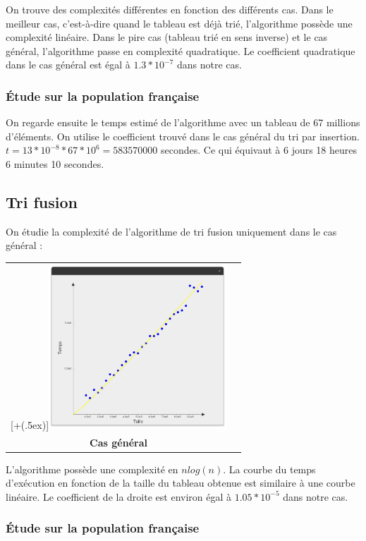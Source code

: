 \documentclass[12pt]{article}
\newcommand*{\addheight}[2][.5ex]{%
  \raisebox{0pt}[\dimexpr\height+(#1)\relax]{#2}%
}
\begin{document}
On trouve des complexités différentes en fonction des différents cas. Dans le meilleur cas, c'est-à-dire quand le tableau est déjà trié, l'algorithme possède une complexité linéaire. Dans le pire cas (tableau trié en sens inverse) et le cas général, l'algorithme passe en complexité quadratique. Le coefficient quadratique dans le cas général est égal à $1.3*10^{-7}$ dans notre cas.

\subsubsection*{Étude sur la population française}

On regarde ensuite le temps estimé de l'algorithme avec un tableau de 67 millions d'éléments.
On utilise le coefficient trouvé dans le cas général du tri par insertion.
$ t = 13*10^{-8} * 67*10^6 = 583570000 $ secondes. Ce qui équivaut à 6 jours 18 heures 6 minutes 10 secondes.

\subsection{Tri fusion}

On étudie la complexité de l'algorithme de tri fusion uniquement dans le cas général :

\begin{tabular}[H]{c c}
    \addheight{\includegraphics[width=18em]{fus_gen.png}}  & \\
    \small \textbf{Cas général} & \\
\end{tabular}

L'algorithme possède une complexité en $n log(n)$. La courbe du temps d'exécution en fonction de la taille du tableau obtenue est similaire à une courbe linéaire.
Le coefficient de la droite est environ égal à $1.05*10^{-5}$ dans notre cas.

\subsubsection*{Étude sur la population française}
\end{document}
